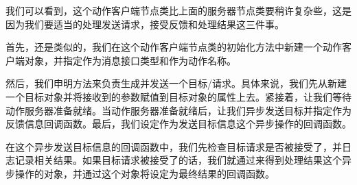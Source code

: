 \documentclass[letterpaper,10pt,english]{sphinxmanual}
\begin{document}
\begin{sphinxVerbatim}[commandchars=\\\{\}]
 

      

    \PYG{p}{[}    \PYG{p}{[}\PYG{p}{]}\PYG{p}{]}



   
\end{sphinxVerbatim}

\sphinxAtStartPar
我们可以看到，这个动作客户端节点类比上面的服务器节点类要稍许复杂些，这是因为我们要适当的处理发送请求，接受反馈和处理结果这三件事。

\sphinxAtStartPar
首先，还是类似的，我们在这个动作客户端节点类的初始化方法中新建一个动作客户端对象，并指定作为消息接口类型和作为动作名称。

\sphinxAtStartPar
然后，我们申明方法来负责生成并发送一个目标/请求。具体来说，我们先从新建一个目标对象并将接收到的参数赋值到目标对象的属性上去。紧接着，让我们等待动作服务器准备就绪。当动作服务器准备就绪后，让我们异步发送目标并指定作为反馈信息回调函数。最后，我们设定作为发送目标信息这个异步操作的回调函数。

\sphinxAtStartPar
在这个异步发送目标信息的回调函数中，我们先检查目标请求是否被接受了，并日志记录相关结果。如果目标请求被接受了的话，我们就通过来得到处理结果这个异步操作的对象，并通过这个对象将设定为最终结果的回调函数。
\end{document}
